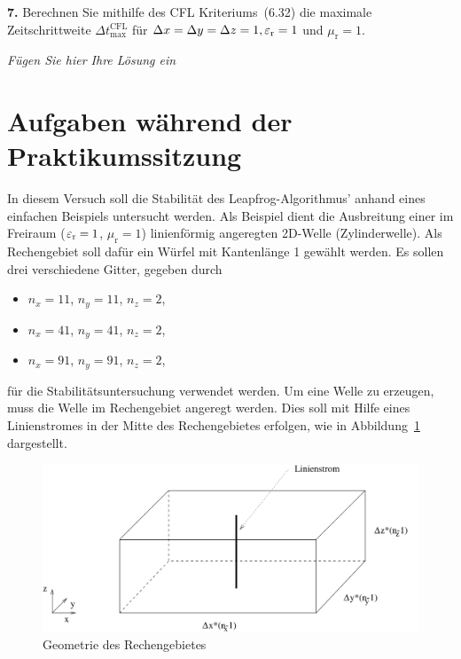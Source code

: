 \documentclass[Protokollheft.tex]{subfiles}
\begin{document}
\begin{framed}
	\noindent \textbf{7.} Berechnen Sie mithilfe des CFL Kriteriums~(6.32) die maximale
    Zeitschrittweite $\Delta t_{\text{max}}^{\text{CFL}}$ für $\Delta x=\Delta
    y=\Delta z=1, \varepsilon_\text{r}=1$ und $\mu_\text{r}=1$.\label{exer:deltaTmaxCFL}
\end{framed}

\emph{Fügen Sie hier Ihre Lösung ein}

\section{Aufgaben während der Praktikumssitzung}
In diesem Versuch soll die Stabilität des Leapfrog-Algorithmus' anhand eines einfachen Beispiels untersucht werden.
Als Beispiel dient die Ausbreitung einer im Freiraum ($\varepsilon_\text{r}=1$, $\mu_\text{r}=1$) linienförmig angeregten 2D-Welle (Zylinderwelle). Als Rechengebiet soll dafür ein Würfel mit Kantenlänge 1 gewählt werden. Es sollen drei verschiedene Gitter, gegeben durch
\begin{itemize}
    \item $n_x=11$, $n_y=11$, $n_z=2$,
    \item $n_x=41$, $n_y=41$, $n_z=2$,
    \item $n_x=91$, $n_y=91$, $n_z=2$,
\end{itemize}
für die Stabilitätsuntersuchung verwendet werden. Um eine Welle zu erzeugen, muss die Welle im Rechengebiet angeregt werden. Dies soll mit Hilfe eines
Linienstromes in der Mitte des Rechengebietes erfolgen, wie in
Abbildung~\ref{fig:anregung} dargestellt.\\

\begin{figure}[h]
    \centering
    \includegraphics[scale=0.7]{v6_praktskizze.pdf}
    \caption{Geometrie des Rechengebietes}\label{fig:anregung}
\end{figure}
\end{document}
